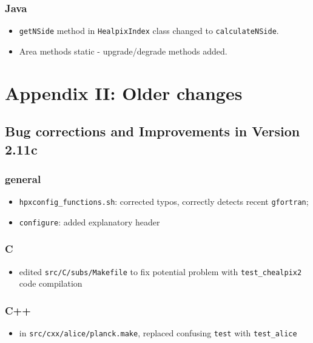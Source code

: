\documentclass[12pt,twoside]{article}
\begin{document}
\subsubsection[Java]{Java}
	\begin{itemize}
	\item {\tt getNSide} method in {\tt HealpixIndex} class changed to {\tt calculateNSide}.
	\item Area methods static - upgrade/degrade methods added.
	\end{itemize}


{\footnotesize{%
\section{Appendix II: Older changes}
\subsection{Bug corrections and Improvements in Version 2.11c}
%
\subsubsection[New General Improvements]{general}
\begin{itemize}
	\item {\tt hpxconfig\_functions.sh}: corrected typos,
correctly detects recent {\tt gfortran}; 
	\item {\tt configure}: added explanatory header
\end{itemize}

\subsubsection[C]{C}	
	\begin{itemize}
	\item edited {\tt src/C/subs/Makefile} to fix potential problem with
{\tt test\_chealpix2} code compilation
	\end{itemize}

\subsubsection[C++]{C++}
	\begin{itemize}
	\item in {\tt src/cxx/alice/planck.make}, replaced confusing {\tt test} with {\tt test\_alice}
	\end{itemize}

}}
\end{document}
